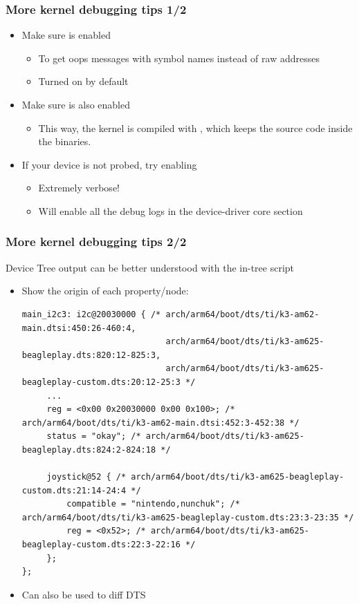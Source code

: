 \begin{frame}
  \frametitle{More kernel debugging tips 1/2}
  \begin{itemize}
  \item Make sure  is enabled
    \begin{itemize}
    \item To get oops messages with symbol names instead of raw
      addresses
    \item Turned on by default
    \end{itemize}
  \item Make sure  is also enabled
    \begin{itemize}
    \item This way, the kernel is compiled with , which keeps the source code inside the binaries.
    \end{itemize}
  \item If your device is not probed, try enabling
    \begin{itemize}
    \item Extremely verbose!
    \item Will enable all the debug logs in the device-driver core
      section
    \end{itemize}
  \end{itemize}
\end{frame}

\begin{frame}[fragile]
  \frametitle{More kernel debugging tips 2/2}
  Device Tree output can be better understood with the in-tree  script
  \begin{itemize}
  \item Show the origin of each property/node: 
    \begin{verbatim}
main_i2c3: i2c@20030000 { /* arch/arm64/boot/dts/ti/k3-am62-main.dtsi:450:26-460:4,
                             arch/arm64/boot/dts/ti/k3-am625-beagleplay.dts:820:12-825:3,
                             arch/arm64/boot/dts/ti/k3-am625-beagleplay-custom.dts:20:12-25:3 */
     ...
     reg = <0x00 0x20030000 0x00 0x100>; /* arch/arm64/boot/dts/ti/k3-am62-main.dtsi:452:3-452:38 */
     status = "okay"; /* arch/arm64/boot/dts/ti/k3-am625-beagleplay.dts:824:2-824:18 */

     joystick@52 { /* arch/arm64/boot/dts/ti/k3-am625-beagleplay-custom.dts:21:14-24:4 */
         compatible = "nintendo,nunchuk"; /* arch/arm64/boot/dts/ti/k3-am625-beagleplay-custom.dts:23:3-23:35 */
         reg = <0x52>; /* arch/arm64/boot/dts/ti/k3-am625-beagleplay-custom.dts:22:3-22:16 */
     };
};
    \end{verbatim}
  \item Can also be used to diff DTS
  \end{itemize}
\end{frame}

